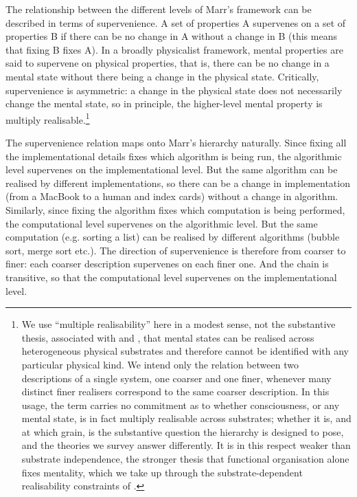 \documentclass[11pt, a4paper, onecolumn, gdm]{google}
\begin{document}
The relationship between the different levels of Marr's framework can be described in terms of supervenience.
A set of properties A supervenes on a set of properties B if there can be no change in A without a change in B (this means that fixing B fixes A).
In a broadly physicalist framework, mental properties are said to supervene on physical properties, that is, there can be no change in a mental state without there being a change in the physical state.
Critically, supervenience is asymmetric: a change in the physical state does not necessarily change the mental state, so in principle, the higher-level mental property is multiply realisable.\footnote{We use ``multiple realisability'' here in a modest sense, not the substantive thesis, associated with \citet{putnam1967} and \citet{fodor1974}, that mental states can be realised across heterogeneous physical substrates and therefore cannot be identified with any particular physical kind. We intend only the relation between two descriptions of a single system, one coarser and one finer, whenever many distinct finer realisers correspond to the same coarser description. In this usage, the term carries no commitment as to whether consciousness, or any mental state, is in fact multiply realisable across substrates; whether it is, and at which grain, is the substantive question the hierarchy is designed to pose, and the theories we survey answer differently. It is in this respect weaker than substrate independence, the stronger thesis that functional organisation alone fixes mentality, which we take up through the substrate-dependent realisability constraints of .}

The supervenience relation maps onto Marr's hierarchy naturally.
Since fixing all the implementational details fixes which algorithm is being run, the algorithmic level supervenes on the implementational level.
But the same algorithm can be realised by different implementations, so there can be a change in implementation (from a MacBook to a human and index cards) without a change in algorithm.
Similarly, since fixing the algorithm fixes which computation is being performed, the computational level supervenes on the algorithmic level.
But the same computation (e.g. sorting a list) can be realised by different algorithms (bubble sort, merge sort etc.).
The direction of supervenience is therefore from coarser to finer: each coarser description supervenes on each finer one.
And the chain is transitive, so that the computational level supervenes on the implementational level.
\end{document}
